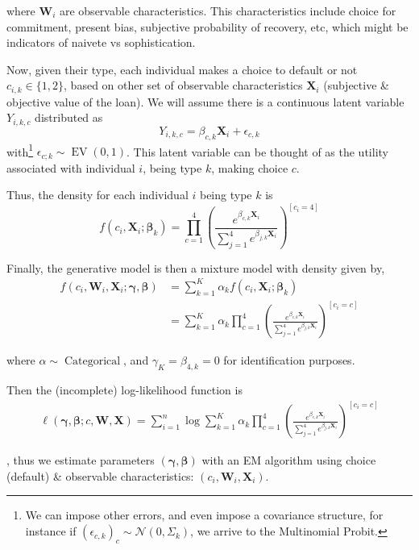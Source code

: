 \documentclass[oneside,11pt]{article}
\begin{document}
where $\mathbf{W}_i$ are observable characteristics. This characteristics include choice for commitment, present bias, subjective probability of recovery, etc, which might be indicators of naivete vs sophistication.  

Now, given their type, each individual makes a choice to default or not $c_{i,k} \in \{1,2\}$, based on other set of observable characteristics $\mathbf{X}_i$ (subjective \& objective value of the loan). We will assume there is a continuous latent variable $Y_{i,k,c}$ distributed as
\[Y_{i,k,c} = \beta_{c,k}\mathbf{X}_{i} +\epsilon_{c,k}\]
with\footnote{We can impose other errors, and even impose a covariance structure, for instance if $(\epsilon_{c,k})_{c}\sim\mathcal{N}(0,\Sigma_k)$, we arrive to the Multinomial Probit.} $\epsilon_{c;k}\sim\operatorname{EV}(0,1)$. This latent variable can be thought of as the utility associated with individual $i$, being type $k$, making choice $c$. 



Thus, the density for each individual $i$ being type $k$ is
\[f(c_i,\mathbf{X}_i; \bm\beta_{k}) = \prod_{c=1}^4\left(\frac{e^{\beta_{c,k} \mathbf{X}_i}}{\sum_{j=1}^{4} e^{\beta_{j,k}  \mathbf{X}_i}}\right)^{[c_i=4]}\]

Finally, the generative model is then a mixture model with density given by,
\begin{align*}
    f(c_i ,\mathbf{W}_i, \mathbf{X}_i; \bm{\gamma},\bm{\beta}) &= \sum_{k=1}^K \alpha_k f(c_i,\mathbf{X}_i; \bm\beta_{k}) \\
    &= \sum_{k=1}^K \alpha_k \prod_{c=1}^4\left(\frac{e^{\beta_{c,k} \mathbf{X}_i}}{\sum_{j=1}^{4} e^{\beta_{j,k}  \mathbf{X}_i}}\right)^{[c_i=c]} 
\end{align*}



where $\alpha\sim \operatorname{Categorical}$, and $\gamma_{K} = \beta_{4,k}=0$ for identification purposes. 

Then the (incomplete) log-likelihood function is
\begin{align*}
    \ell(\bm{\gamma}, \bm{\beta}; c, \mathbf{W},  \mathbf{X}) = \sum_{i=1}^n \log\sum_{k=1}^K \alpha_k \prod_{c=1}^4\left(\frac{e^{\beta_{c,k} \mathbf{X}_i}}{\sum_{j=1}^{4} e^{\beta_{j,k}  \mathbf{X}_i}}\right)^{[c_i=c]} 
\end{align*}

, thus we estimate parameters $(\bm{\gamma}, \bm{\beta})$ with an EM algorithm using choice (default)
\& observable characteristics: $(c_i,\mathbf{W}_i,\mathbf{X}_i)$.
\end{document}
